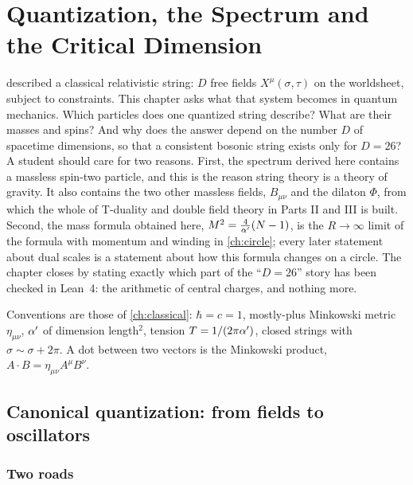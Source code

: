 \chapter{Quantization, the Spectrum and the Critical Dimension}\label{ch:quantum}

 described a classical relativistic string: $D$ free fields $X^\mu(\sigma,\tau)$
on the worldsheet, subject to constraints. This chapter asks what that system becomes in quantum
mechanics. Which particles does one quantized string describe? What are their masses and spins?
And why does the answer depend on the number $D$ of spacetime dimensions, so that a consistent
bosonic string exists only for $D=26$? A student should care for two reasons. First, the
spectrum derived here contains a massless spin-two particle, and this is the reason string
theory is a theory of gravity. It also contains the two other massless fields, $B_{\mu\nu}$ and
the dilaton $\Phi$, from which the whole of T-duality and double field theory in Parts II and
III is built. Second, the mass formula obtained here, $M^2=\frac{4}{\alpha'}(N-1)$, is the
$R\to\infty$ limit of the formula with momentum and winding in \cref{ch:circle}; every later
statement about dual scales is a statement about how this formula changes on a circle.
The chapter closes by stating exactly which part of the ``$D=26$'' story has been checked in
Lean~4: the arithmetic of central charges, and nothing more.

Conventions are those of \cref{ch:classical}: $\hbar=c=1$, mostly-plus Minkowski metric
$\eta_{\mu\nu}$, $\alpha'$ of dimension length$^2$, tension $T=1/(2\pi\alpha')$, closed strings with
$\sigma\sim\sigma+2\pi$. A dot between two vectors is the Minkowski product,
$A\cdot B=\eta_{\mu\nu}A^\mu B^\nu$.

\section{Canonical quantization: from fields to oscillators}\label{sec:quantum:canonical}

\subsection{Two roads}

